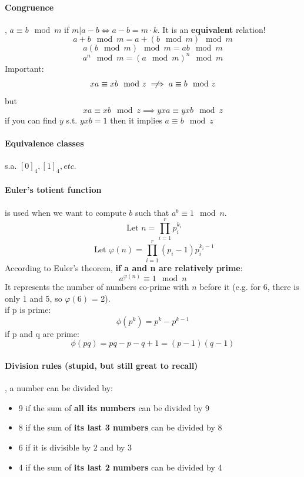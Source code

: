 \documentclass{article}
\begin{document}
\paragraph{Congruence}, $ a \equiv b \mod m $ if $ m | a - b \Leftrightarrow a - b = m \cdot k$. It is an \textbf{equivalent} relation!\\
\[ a + b \mod m = a + (b \mod m) \mod m \]
\[ a (b \mod m) \mod m = ab \mod m \]
\[ a^n \mod m = (a \mod m)^n \mod m \]
Important:
\[ xa \equiv xb \mod z \centernot\implies a \equiv b \mod z \]
but
\[ xa \equiv xb \mod z \implies yxa \equiv yxb \mod z \]
if you can find $ y $ s.t. $ yxb = 1 $ then it implies $ a \equiv b \mod z$

\paragraph{Equivalence classes} s.a. $ [0]_4, [1]_4, etc. $

\paragraph{Euler's totient function} is used when we want to compute $ b $ such that $ a^b \equiv 1 \mod{n}$.
\[ \text{ Let } n = \prod_{i = 1}^{r} p_i^{k_i}\]
\[ \text{ Let } \varphi{(n)} = \prod_{i = 1}^{r} (p_i - 1)p_i^{k_i-1} \]
According to Euler's theorem, \textbf{if a and n are relatively prime}:
\[ a^{\varphi(n)} \equiv 1 \mod{n} \]
It represents the number of numbers co-prime with $ n $ before it (e.g. for 6, there is only 1 and 5, so $\varphi(6)$ = 2).\\
if p is prime:
\[ \phi(p^k) = p^k - p^{k-1} \]
if p and q are prime:
\[ \phi(pq) = pq - p - q + 1 = (p-1)(q-1) \]

\paragraph{Division rules (stupid, but still great to recall)}, a number can be divided by:
\begin{itemize}
    \item 9 if the sum of \textbf{all its numbers} can be divided by 9
    \item 8 if the sum of \textbf{its last 3 numbers} can be divided by 8
    \item 6 if it is divisible by 2 and by 3
    \item 4 if the sum of \textbf{its last 2 numbers} can be divided by 4
\end{itemize}
\end{document}
